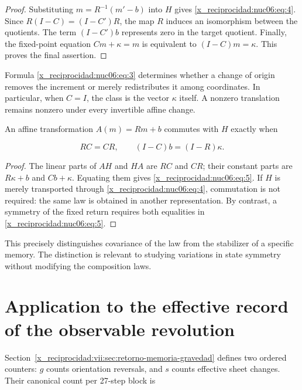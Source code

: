 \begin{proof}
Substituting \(m=R^{-1}(m'-b)\) into \(H\) gives \eqref{x_reciprocidad:nuc06:eq:4}. Since \(R(I-C)=(I-C')R\), the map \(R\) induces an isomorphism between the quotients. The term \((I-C')b\) represents zero in the target quotient. Finally, the fixed-point equation \(Cm+\kappa=m\) is equivalent to \((I-C)m=\kappa\). This proves the final assertion.
\end{proof}

Formula \eqref{x_reciprocidad:nuc06:eq:3} determines whether a change of origin removes the increment or merely redistributes it among coordinates. In particular, when \(C=I\), the class is the vector \(\kappa\) itself. A nonzero translation remains nonzero under every invertible affine change.

\begin{proposition}

An affine transformation \(A(m)=Rm+b\) commutes with \(H\) exactly when

\begin{equation}
RC=CR,\qquad (I-C)b=(I-R)\kappa.
\label{x_reciprocidad:nuc06:eq:5}
\end{equation}
\end{proposition}

\begin{proof}
The linear parts of \(AH\) and \(HA\) are \(RC\) and \(CR\); their constant parts are \(R\kappa+b\) and \(Cb+\kappa\). Equating them gives \eqref{x_reciprocidad:nuc06:eq:5}. If \(H\) is merely transported through \eqref{x_reciprocidad:nuc06:eq:4}, commutation is not required: the same law is obtained in another representation. By contrast, a symmetry of the fixed return requires both equalities in \eqref{x_reciprocidad:nuc06:eq:5}.
\end{proof}

This precisely distinguishes covariance of the law from the stabilizer of a specific memory. The distinction is relevant to studying variations in state symmetry without modifying the composition laws.

\section{Application to the effective record of the observable revolution}

Section~\ref{x_reciprocidad:vii:sec:retorno-memoria-gravedad} defines two ordered counters: \(g\) counts orientation reversals, and \(s\) counts effective sheet changes. Their canonical count per 27-step block is

